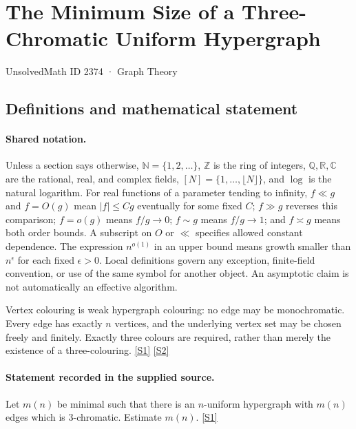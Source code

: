 \documentclass[11pt,a4paper]{article}
\newcommand{\N}{\mathbb{N}}
\newcommand{\Z}{\mathbb{Z}}
\newcommand{\Q}{\mathbb{Q}}
\newcommand{\R}{\mathbb{R}}
\newcommand{\C}{\mathbb{C}}
\newcommand{\sref}[2]{\hyperlink{source:#1:#2}{[S#2]}}
\begin{document}

\setcounter{section}{2373}

\section{The Minimum Size of a Three-Chromatic Uniform Hypergraph}\label{2374}

{\small\sffamily UnsolvedMath ID 2374 · Graph Theory}

\subsection{Definitions and mathematical statement}

\paragraph{Shared notation.}Unless a section says otherwise, $\N=\{1,2,\ldots\}$,
$\Z$ is the ring of integers, $\Q,\R,\C$ are the rational, real, and complex
fields, $[N]=\{1,\ldots,\lfloor N\rfloor\}$, and $\log$ is the natural
logarithm. For real functions of a parameter tending to infinity,
$f\ll g$ and $f=O(g)$ mean $|f|\leq Cg$ eventually for some fixed $C$;
$f\gg g$ reverses this comparison; $f=o(g)$ means $f/g\to0$;
$f\sim g$ means $f/g\to1$; and $f\asymp g$ means both order bounds.
A subscript on $O$ or $\ll$ specifies allowed constant dependence.
The expression $n^{o(1)}$ in an upper bound means growth smaller than
$n^\epsilon$ for each fixed $\epsilon>0$. Local definitions govern any
exception, finite-field convention, or use of the same symbol for another
object. An asymptotic claim is not automatically an effective algorithm.



Vertex colouring is weak hypergraph colouring: no edge may be monochromatic. Every edge has exactly $n$ vertices, and the underlying vertex set may be chosen freely and finitely. Exactly three colours are required, rather than merely the existence of a three-colouring. \sref{2374}{1} \sref{2374}{2}

\paragraph{Statement recorded in the supplied source.}
Let $m(n)$ be minimal such that there is an $n$-uniform hypergraph with $m(n)$ edges which is $3$-chromatic. Estimate $m(n)$. \sref{2374}{1}
\end{document}
